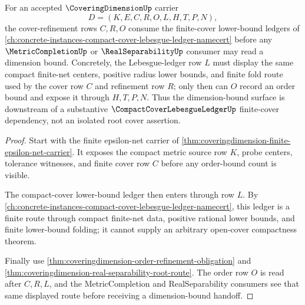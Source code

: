 \begin{theorem}
\label{thm:coveringdimension-compact-cover-forward-dependency}
For an accepted $\CoveringDimensionUp$ carrier
$$
D=(K,E,C,R,O,L,H,T,P,N),
$$
the cover-refinement rows $C,R,O$ consume the finite-cover lower-bound ledgers of \autoref{ch:concrete-instances-compact-cover-lebesgue-ledger-namecert} before any $\MetricCompletionUp$ or $\RealSeparabilityUp$ consumer may read a dimension bound. Concretely, the Lebesgue-ledger row $L$ must display the same compact finite-net centers, positive radius lower bounds, and finite fold route used by the cover row $C$ and refinement row $R$; only then can $O$ record an order bound and expose it through $H,T,P,N$. Thus the dimension-bound surface is downstream of a substantive $\CompactCoverLebesgueLedgerUp$ finite-cover dependency, not an isolated root cover assertion.
\end{theorem}
\begin{proof}
Start with the finite epsilon-net carrier of \autoref{thm:coveringdimension-finite-epsilon-net-carrier}. It exposes the compact metric source row $K$, probe centers, tolerance witnesses, and finite cover row $C$ before any order-bound count is visible.

The compact-cover lower-bound ledger then enters through row $L$. By \autoref{ch:concrete-instances-compact-cover-lebesgue-ledger-namecert}, this ledger is a finite route through compact finite-net data, positive rational lower bounds, and finite lower-bound folding; it cannot supply an arbitrary open-cover compactness theorem.

Finally use \autoref{thm:coveringdimension-order-refinement-obligation} and \autoref{thm:coveringdimension-real-separability-root-route}. The order row $O$ is read after $C,R,L$, and the MetricCompletion and RealSeparability consumers see that same displayed route before receiving a dimension-bound handoff.
\end{proof}

